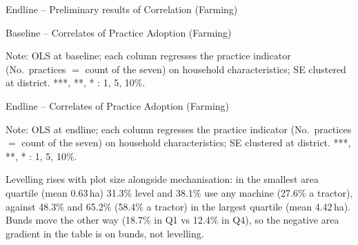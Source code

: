 \documentclass[aspectratio=169]{beamer}
\newcommand{\notefont}{\fontsize{5pt}{6pt}\selectfont}
\begin{document}
\begin{frame}{Endline -- Preliminary results of Correlation (Farming)}
	\centering
	
\end{frame}

\begin{frame}{Baseline -- Correlates of Practice Adoption (Farming)}
	\centering
	\begin{minipage}{0.94\textwidth}
		\notefont
		Note: OLS at baseline; each column regresses the practice indicator (No.\ practices
		$=$ count of the seven) on household characteristics; SE clustered at district.
		***, **, * : 1, 5, 10\%.
	\end{minipage}
\end{frame}

\begin{frame}{Endline -- Correlates of Practice Adoption (Farming)}
	\centering
	\begin{minipage}{0.94\textwidth}
		\notefont
		Note: OLS at endline; each column regresses the practice indicator (No.\ practices
		$=$ count of the seven) on household characteristics; SE clustered at district.
		***, **, * : 1, 5, 10\%.
		\par Levelling rises with plot size alongside mechanisation: in the smallest area quartile
		(mean 0.63\,ha) 31.3\% level and 38.1\% use any machine (27.6\% a tractor), against 48.3\%
		and 65.2\% (58.4\% a tractor) in the largest quartile (mean 4.42\,ha). Bunds move the other
		way (18.7\% in Q1 vs 12.4\% in Q4), so the negative area gradient in the table is on bunds,
		not levelling.
	\end{minipage}
\end{frame}









\end{document}
